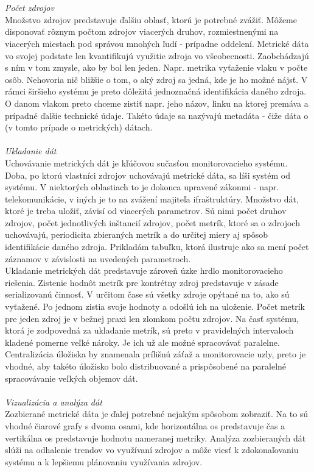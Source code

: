 \documentclass[11pt,final,oneside]{fithesis}
\begin{document}
\\
\\ \emph{Počet zdrojov}
\\
Množstvo zdrojov predstavuje ďalšiu oblasť, ktorú je potrebné zvážiť. Môžeme disponovať rôznym počtom zdrojov viacerých druhov, rozmiestnenými na viacerých miestach pod správou mnohých ľudí - prípadne oddelení. Metrické dáta vo svojej
podstate len kvantifikujú využitie zdroja vo všeobecnosti. Zaobchádzajú s ním v tom zmysle, ako by bol len jeden. Napr. metrika vyťaženie vlaku v počte osôb. Nehovoria nič bližšie o tom, o aký zdroj sa jedná, kde je ho možné nájsť. V rámci širšieho
systému je preto dôležitá jednoznačná identifikácia daného zdroja. O danom vlakom preto chceme zistiť napr. jeho názov, linku na ktorej premáva a prípadné ďalšie technické údaje. Takéto údaje sa nazývajú metadáta - čiže dáta o (v tomto 
prípade o metrických) dátach.
\\
\\ \emph{Ukladanie dát}
\\
Uchovávanie metrických dát je kľúčovou sučasťou monitorovacieho systému. Doba, po ktorú vlastníci zdrojov uchovávajú metrické dáta, sa líši systém od systému. V niektorých oblastiach to je dokonca upravené zákonmi - napr. telekomunikácie,
v iných je to na zvážení majiteľa ifraštruktúry. Množstvo dát, ktoré je treba uložiť, závisí od viacerých parametrov. Sú nimi počet druhov zdrojov, počet jednotlivých inštancií zdrojov, počet metrík, ktoré sa o zdrojoch
uchovávajú, periodicita zbieraných metrík a do určitej miery aj spôsob identifikácie daného zdroja. Prikladám tabuľku, ktorá ilustruje ako sa mení počet záznamov v závislosti na uvedených parametroch.
\\Ukladanie metrických dát predstavuje zároveň úzke hrdlo monitorovacieho riešenia. Zistenie hodnôt metrík pre kontrétny zdroj predstavuje v zásade serializovanú činnosť. V určitom čase sú všetky zdroje opýtané na to, ako sú vyťažené. Po jednom
zistia svoje hodnoty a odošlú ich na uloženie. Počet metrík pre jeden zdroj je v bežnej praxi len zlomkom počtu zdrojov. Na časť systému, ktorá je zodpovedná za ukladanie metrík, sú preto v pravidelných intervaloch kladené pomerne 
veľké nároky. Je ich už ale možné spracovávať paralelne. Centralizácia úložiska by znamenala prílišnú záťaž a monitorovacie uzly, preto je vhodné, aby takéto úložisko bolo distribuované a prispôsobené na paralelné spracovávanie veľkých
objemov dát.
\\
\\ \emph{Vizualizácia a analýza dát}
\\
Zozbierané metrické dáta je ďalej potrebné nejakým spôsobom zobraziť. Na to sú vhodné čiarové grafy s dvoma osami, kde horizontálna os predstavuje čas a vertikálna os predstavuje hodnotu nameranej metriky.
Analýza zozbieraných dát slúži na odhalenie trendov vo využívaní zdrojov a môže viesť k zdokonaľovaniu systému a k lepšiemu plánovaniu využívania zdrojov.
\end{document}
